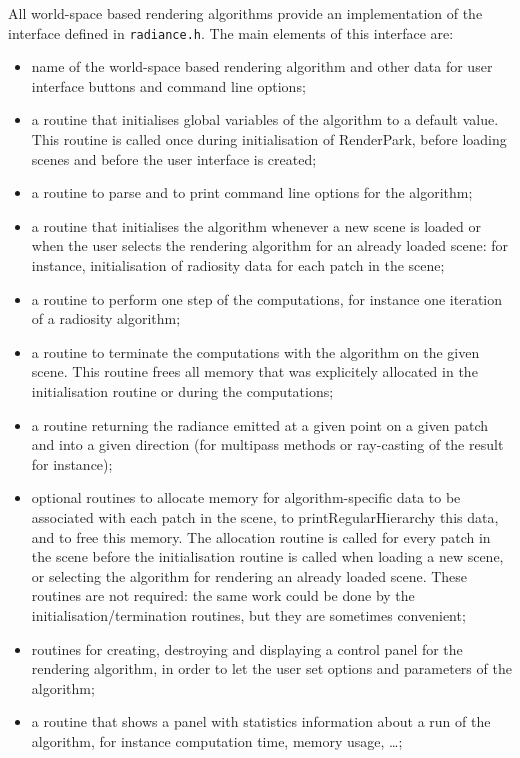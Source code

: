 \documentclass[11pt]{report}
\begin{document}
All world-space based rendering algorithms provide an implementation of the 
interface defined in {\tt radiance.h}. The main elements of this interface
are:
\begin{itemize}
\item	name of the world-space based rendering algorithm and other data for
	user interface buttons and command line options;
\item	a routine that initialises global variables of the algorithm to 
	a default value. This routine is called once during initialisation of
	RenderPark, before loading scenes and before the user interface is created;
\item	a routine to parse and to print command line options for the algorithm;
\item	a routine that initialises the algorithm whenever a new scene is loaded
	or when the user selects the rendering algorithm for an already loaded scene:
	for instance, initialisation of radiosity data for each patch in the scene;
\item	a routine to perform one step of the computations, for instance one iteration
	of a radiosity algorithm;
\item	a routine to terminate the computations with the algorithm on the given scene.
	This routine frees all memory that was explicitely allocated in the 
	initialisation routine or during the computations;
\item	a routine returning the radiance emitted at a given point on a given patch
	and into a given direction (for multipass methods or ray-casting of the result
	for instance);
\item	optional 
	routines to allocate memory for algorithm-specific data to be associated
	with each patch in the scene, to printRegularHierarchy this data, and to free this memory.
	The allocation routine is called for every patch in the scene before the
	initialisation routine is called when loading a new scene, or selecting
	the algorithm for rendering an already loaded scene. These routines
	are not required: the same work could be done by the
	initialisation/termination routines, but they are sometimes convenient;
\item	routines for creating, destroying and displaying a control panel for the
	rendering algorithm, in order to let the user set options and parameters
	of the algorithm;
\item	a routine that shows a panel with statistics information about a run of
	the algorithm, for instance computation time, memory usage, \ldots;

\end{itemize}
\end{document}
